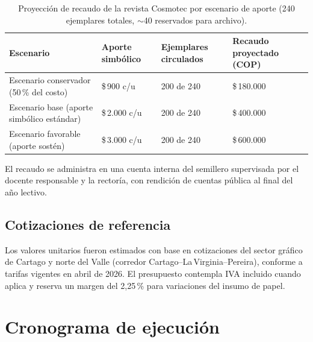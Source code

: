 \documentclass[12pt, letterpaper]{article}
\newcommand{\pesos}[1]{\$\,#1}
\begin{document}
\renewcommand{\arraystretch}{1.25}
\begin{table}[H]
\centering
\small
\begin{tabularx}{\linewidth}{L{5.6cm} R{2.4cm} R{2.4cm} X}
\toprule
{}
\textbf{Escenario} & \textbf{Aporte simbólico} & \textbf{Ejemplares circulados} & \textbf{Recaudo proyectado (COP)} \\
\midrule
Escenario conservador (50\,\% del costo) & \pesos{900} c/u & 200 de 240 & \pesos{180.000} \\
Escenario base (aporte simbólico estándar) & \pesos{2.000} c/u & 200 de 240 & \pesos{400.000} \\
Escenario favorable (aporte sostén) & \pesos{3.000} c/u & 200 de 240 & \pesos{600.000} \\
\bottomrule
\end{tabularx}
\caption{Proyección de recaudo de la revista Cosmotec por escenario de aporte (240 ejemplares totales, $\sim$40 reservados para archivo).}
\end{table}

El recaudo se administra en una cuenta interna del semillero supervisada por el docente responsable y la rectoría, con rendición de cuentas pública al final del año lectivo.

\subsection{Cotizaciones de referencia}

Los valores unitarios fueron estimados con base en cotizaciones del sector gráfico de Cartago y norte del Valle (corredor Cartago–La\,Virginia–Pereira), conforme a tarifas vigentes en abril de 2026. El presupuesto contempla IVA incluido cuando aplica y reserva un margen del 2{,}25\,\% para variaciones del insumo de papel.

\section{Cronograma de ejecución}
\end{document}
